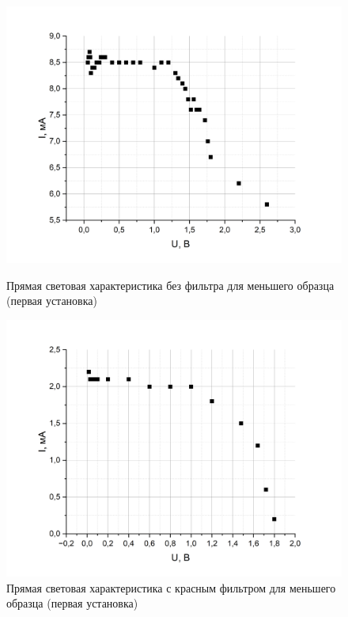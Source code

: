 \documentclass[a4paper,12pt]{article} %
\begin{document}
\begin{figure}[h]
\begin{center}
\begin{minipage}[h]{0.45\linewidth}
\includegraphics[width=1\linewidth]{прямая световая без фильтра.png}
\caption{Прямая световая характеристика без фильтра для меньшего образца (первая установка)} %
\label{ris:experimoriginal} %
\end{minipage}
\hfill 
\begin{minipage}[h]{0.45\linewidth}
\includegraphics[width=1\linewidth]{прямая световая с фильтром.png}
\caption{Прямая световая характеристика с красным фильтром для меньшего образца (первая установка)}
\label{ris:experimcoded}
\end{minipage}
\end{center}
\end{figure}
\end{document}
